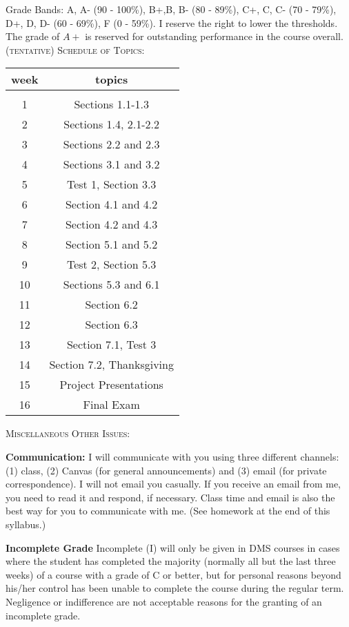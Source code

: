 \documentclass[11pt]{article}
\begin{document}
Grade Bands: A, A- (90 - 100\%), B+,B, B- (80 - 89\%), C+, C, C- (70 - 79\%), D+, D, D-
(60 - 69\%), F (0 - 59\%).  I reserve the right to lower the thresholds. The grade of $A+$ is reserved for outstanding performance in the course overall.\\

\textsc{(tentative) Schedule of Topics:}

\begin{tabular}{c | c}
week & topics \\
\hline \hline\\
1& Sections 1.1-1.3\\ \hline
2& Sections 1.4, 2.1-2.2\\ \hline
3& Sections 2.2 and 2.3\\ \hline
4& Sections 3.1 and 3.2\\ \hline
5& Test 1, Section 3.3\\ \hline
6& Section 4.1 and 4.2\\ \hline
7& Section 4.2 and 4.3\\ \hline
8& Section 5.1 and 5.2\\ \hline
9& Test 2, Section 5.3\\ \hline
10& Sections 5.3 and 6.1\\ \hline
11& Section 6.2\\ \hline
12& Section 6.3\\ \hline
13& Section 7.1, Test 3 \\ \hline
14& Section 7.2, Thanksgiving\\ \hline
15& Project Presentations\\ \hline
16& Final Exam\\ 
\end{tabular}

\textsc{Miscellaneous Other Issues:}

\textbf{Communication:} I will communicate with you using three different channels: (1) class, (2) Canvas (for general announcements) and (3) email (for private correspondence). I will not email you casually. If you receive an email from me, you need to read it and respond, if necessary.  Class time and email is also the best way for you to communicate with me. (See homework at the end of this syllabus.)

\textbf{Incomplete Grade} 
Incomplete (I) will only be given in DMS courses in cases where the student has completed the majority (normally all but the last three weeks) of a course with a grade of C or better, but for personal reasons beyond his/her control has been unable to complete the course during the regular term. Negligence or indifference are not acceptable reasons for the granting of an incomplete grade. 
\end{document}
